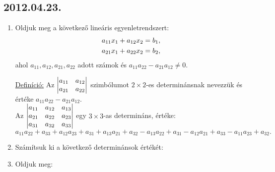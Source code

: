 \subsection*{2012.04.23.}
\begin{enumerate}
\item Oldjuk meg a következő lineáris egyenletrendszert:
\begin{align*}
a_{11}x_1+a_{12}x_2&=b_1,\cr
a_{21}x_1+a_{22}x_2&=b_2,
\end{align*}
ahol $a_{11},a_{12},a_{21},a_{22}$ adott számok és
$a_{11}a_{22}-a_{21}a_{12}\ne 0$.

\medskip
\noindent
\underline{Definíció:} Az $\begin{vmatrix} a_{11} & a_{12} \\ a_{21} & a_{22}\end{vmatrix}$ szimbólumot $2\times 2$-es determinánsnak nevezzük és értéke $a_{11}a_{22}-a_{21}a_{12}$.\\ Az
$\begin{vmatrix} a_{11} & a_{12} & a_{13}\\ a_{21} & a_{22} & a_{23}\\ a_{31} & a_{32} & a_{33}\end{vmatrix}$ egy $3\times 3$-as determináns, értéke:
$$
a_{11}a_{22}+a_{33}+
a_{12}a_{23}+a_{31}+
a_{13}a_{21}+a_{32}-
a_{13}a_{22}+a_{31}-
a_{12}a_{21}+a_{33}-
a_{11}a_{23}+a_{32}.
$$
\item Számítsuk ki a következő determinánsok értékét:

\item Oldjuk meg:
\end{enumerate}

